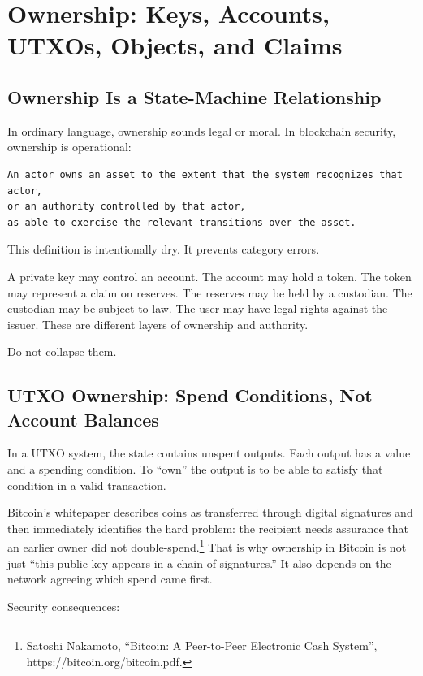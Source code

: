 \section{Ownership: Keys, Accounts, UTXOs, Objects, and Claims}

\subsection{Ownership Is a State-Machine Relationship}

In ordinary language, ownership sounds legal or moral. In blockchain
security, ownership is operational:

\begin{lstlisting}
An actor owns an asset to the extent that the system recognizes that actor,
or an authority controlled by that actor,
as able to exercise the relevant transitions over the asset.
\end{lstlisting}

This definition is intentionally dry. It prevents category errors.

A private key may control an account. The account may hold a token. The
token may represent a claim on reserves. The reserves may be held by a
custodian. The custodian may be subject to law. The user may have legal
rights against the issuer. These are different layers of ownership and
authority.

Do not collapse them.

\subsection{UTXO Ownership: Spend Conditions, Not Account Balances}

In a UTXO system, the state contains unspent outputs. Each output has a
value and a spending condition. To ``own'' the output is to be able to
satisfy that condition in a valid transaction.

Bitcoin's whitepaper describes coins as transferred through digital
signatures and then immediately identifies the hard problem: the
recipient needs assurance that an earlier owner did not
double-spend.\footnote{Satoshi Nakamoto, ``Bitcoin: A Peer-to-Peer
  Electronic Cash System'', https://bitcoin.org/bitcoin.pdf.} That is
why ownership in Bitcoin is not just ``this public key appears in a
chain of signatures.'' It also depends on the network agreeing which
spend came first.

Security consequences:

